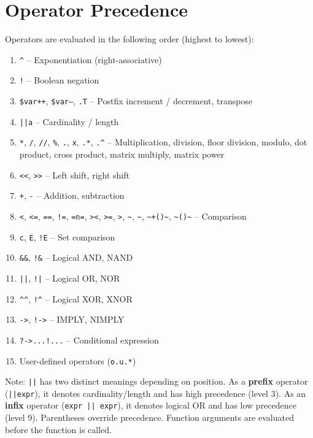 \documentclass{report}
\begin{document}
\section{Operator Precedence}
Operators are evaluated in the following order (highest to lowest):
\begin{enumerate}
\item \texttt{\^{}} -- Exponentiation (right-associative)
\item \texttt{!} -- Boolean negation
\item \texttt{\$var++}, \texttt{\$var--}, \texttt{.T} -- Postfix increment / decrement, transpose
\item \texttt{||a} -- Cardinality / length
\item \texttt{*}, \texttt{/}, \texttt{//}, \texttt{\%}, \texttt{.}, \texttt{x}, \texttt{.*}, \texttt{.\^{}} -- Multiplication, division, floor division, modulo, dot product, cross product, matrix multiply, matrix power
\item \texttt{<<}, \texttt{>>} -- Left shift, right shift
\item \texttt{+}, \texttt{-} -- Addition, subtraction
\item \texttt{<}, \texttt{<=}, \texttt{==}, \texttt{!=}, \texttt{=n=}, \texttt{><}, \texttt{>=}, \texttt{>}, \texttt{\textasciitilde}, \texttt{\textasciitilde*}, \texttt{\textasciitilde+()\textasciitilde}, \texttt{\textasciitilde*()\textasciitilde} -- Comparison
\item \texttt{c}, \texttt{E}, \texttt{!E} -- Set comparison
\item \texttt{\&\&}, \texttt{!\&} -- Logical AND, NAND
\item \texttt{||}, \texttt{!|} -- Logical OR, NOR
\item \texttt{\^{}\^{}}, \texttt{!}\texttt{\^{}} -- Logical XOR, XNOR
\item \texttt{->}, \texttt{!->} -- IMPLY, NIMPLY
\item \texttt{?->...!...} -- Conditional expression
\item User-defined operators (\texttt{o.u.*})
\end{enumerate}

Note: \texttt{||} has two distinct meanings depending on position. As a \textbf{prefix} operator (\texttt{||expr}), it denotes cardinality/length and has high precedence (level 3). As an \textbf{infix} operator (\texttt{expr || expr}), it denotes logical OR and has low precedence (level 9). Parentheses override precedence. Function arguments are evaluated before the function is called.
\end{document}
